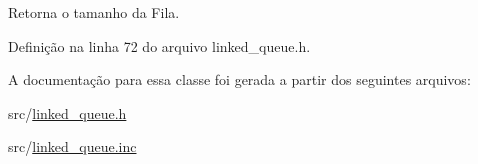 Retorna o tamanho da Fila. 



Definição na linha 72 do arquivo linked\+\_\+queue.\+h.



A documentação para essa classe foi gerada a partir dos seguintes arquivos\+:\begin{DoxyCompactItemize}
\item 
src/\mbox{\hyperlink{linked__queue_8h}{linked\+\_\+queue.\+h}}\item 
src/\mbox{\hyperlink{linked__queue_8inc}{linked\+\_\+queue.\+inc}}\end{DoxyCompactItemize}
